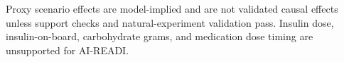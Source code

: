 Proxy scenario effects are model-implied and are not validated causal effects unless support checks and natural-experiment validation pass. Insulin dose, insulin-on-board, carbohydrate grams, and medication dose timing are unsupported for AI-READI.

